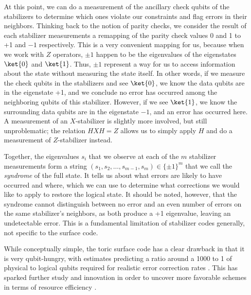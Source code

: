 At this point, we can do a measurement of the ancillary check qubits of the stabilizers to determine which ones violate our constraints and flag errors in their neighbors. Thinking back to the notion of parity checks, we consider the result of each stabilizer measurements a remapping of the parity check values 0 and 1 to +1 and $-1$ respectively. This is a very convenient mapping for us, because when we work with $Z$ operators, $\pm 1$ happen to be the eigenvalues of the eigenstates $\ket{0}$ and $\ket{1}$. Thus, $\pm 1$ represent a way for us to access information about the state without measuring the state itself. In other words, if we measure the check qubits in the stabilizers and see $\ket{0}$, we know the data qubits are in the eigenstate +1, and we conclude no error has occurred among the neighboring qubits of this stabilizer. However, if we see $\ket{1}$, we know the surrounding data qubits are in the eigenstate $-1$, and an error has occurred here. A measurement of an $X$-stabilizer is slightly more involved, but still unproblematic; the relation $HXH = Z$ allows us to simply apply $H$ and do a measurement of $Z$-stabilizer instead. 

Together, the eigenvalues $s_i$ that we observe at each of the $m$ stabilizer measurements form a string $(s_1, s_2, \dots, s_{m-1}, s_m) \in \{\pm1\}^m$ that we call the \emph{syndrome} of the full state. It tells us about what errors are likely to have occurred and where, which we can use to determine what corrections we would like to apply to restore the logical state. It should be noted, however, that the syndrome cannot distinguish between no error and an even number of errors on the same stabilizer's neighbors, as both produce a +1 eigenvalue, leaving an undetectable error. This is a fundamental limitation of stabilizer codes generally, not specific to the surface code.

While conceptually simple, the toric surface code has a clear drawback in that it is very qubit-hungry, with estimates predicting a ratio around a 1000 to 1 of physical to logical qubits required for realistic error correction rates \cite{jaques2024ches_presentation,Gidney2025}. This has sparked further study and innovation in order to uncover more favorable schemes in terms of resource efficiency \cite{Bravyi2024}.

